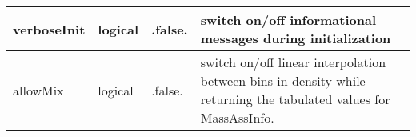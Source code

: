 \documentclass{article}
\begin{document}
\begin{longtable}{llll}
\midrule
verboseInit & \begin{minipage}[t]{2cm}logical\end{minipage} & \begin{minipage}[t]{2cm}.false.\end{minipage} & \begin{minipage}[t]{12cm}switch on/off informational messages during initialization\end{minipage}\\*
\midrule
allowMix & \begin{minipage}[t]{2cm}logical\end{minipage} & \begin{minipage}[t]{2cm}.false.\end{minipage} & \begin{minipage}[t]{12cm}switch on/off linear interpolation between bins in density while returning the tabulated values for MassAssInfo.\end{minipage}\\*
\bottomrule
\end{longtable}
{ }



\end{document}
